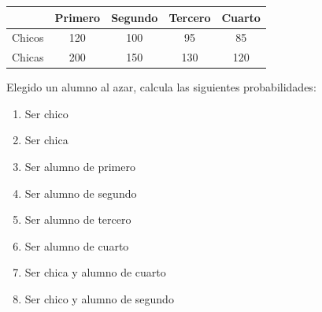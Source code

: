 \documentclass[fleqn]{article}
\begin{document}
\begin{enumerate}
\begin{tabular}{|c|c|c|c|c|}
\hline 
 & Primero & Segundo & Tercero & Cuarto \\ 
\hline 
Chicos & 120 & 100 & 95 & 85 \\ 
\hline 
Chicas & 200 & 150 & 130 & 120 \\ 
\hline 
\end{tabular}

Elegido un alumno al azar, calcula las siguientes probabilidades:
\begin{enumerate}
\item Ser chico \noanswer
\item Ser chica \noanswer
\item Ser alumno de primero \noanswer
\item Ser alumno de segundo \noanswer
\item Ser alumno de tercero \noanswer
\item Ser alumno de cuarto \noanswer
\item Ser chica y alumno de cuarto \noanswer
\item Ser chico y alumno de segundo \noanswer
\end{enumerate}
 \end{enumerate}
\end{document}
